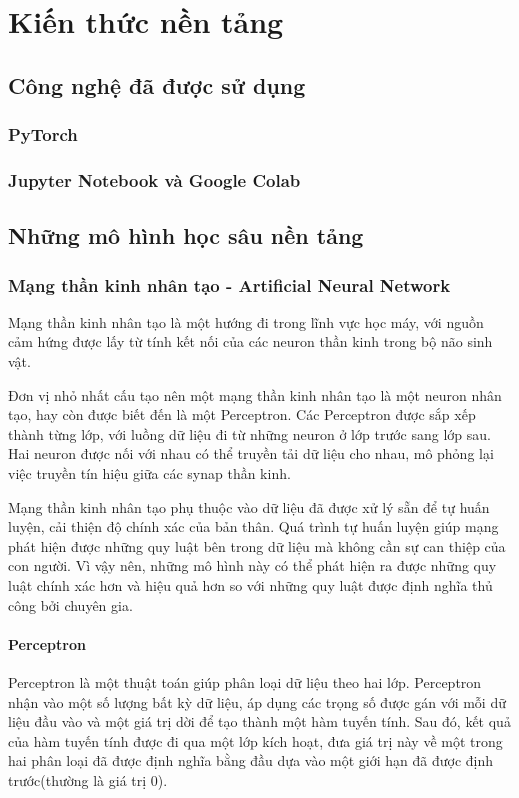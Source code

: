 \chapter{Kiến thức nền tảng}
\section{Công nghệ đã được sử dụng}
\subsection*{PyTorch}
\subsection*{Jupyter Notebook và Google Colab}
\section{Những mô hình học sâu nền tảng}
\subsection{Mạng thần kinh nhân tạo - Artificial Neural Network}
Mạng thần kinh nhân tạo là một hướng đi trong lĩnh vực học máy, với nguồn cảm hứng được lấy từ tính kết nối của các neuron thần kinh trong bộ não sinh vật.

Đơn vị nhỏ nhất cấu tạo nên một mạng thần kinh nhân tạo là một neuron nhân tạo, hay còn được biết đến là một Perceptron. Các Perceptron được sắp xếp thành từng lớp, với luồng dữ liệu đi từ những neuron ở lớp trước sang lớp sau. Hai neuron được nối với nhau có thể truyền tải dữ liệu cho nhau, mô phỏng lại việc truyền tín hiệu giữa các synap thần kinh.

Mạng thần kinh nhân tạo phụ thuộc vào dữ liệu đã được xử lý sẵn để tự huấn luyện, cải thiện độ chính xác của bản thân. Quá trình tự huấn luyện giúp mạng phát hiện được những quy luật bên trong dữ liệu mà không cần sự can thiệp của con người. Vì vậy nên, những mô hình này có thể phát hiện ra được những quy luật chính xác hơn và hiệu quả hơn so với những quy luật được định nghĩa thủ công bởi chuyên gia.
\subsubsection*{Perceptron}
Perceptron là một thuật toán giúp phân loại dữ liệu theo hai lớp. Perceptron nhận vào một số lượng bất kỳ dữ liệu, áp dụng các trọng số được gán với mỗi dữ liệu đầu vào và một giá trị dời để tạo thành một hàm tuyến tính. Sau đó, kết quả của hàm tuyến tính được đi qua một lớp kích hoạt, đưa giá trị này về một trong hai phân loại đã được định nghĩa bằng đầu dựa vào một giới hạn đã được định trước(thường là giá trị 0).

